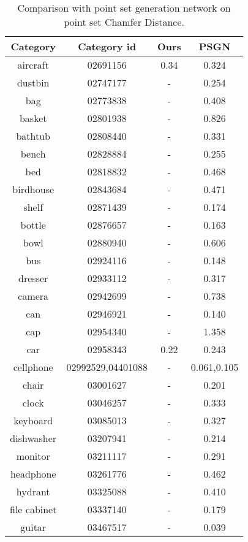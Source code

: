 \begin{table*}
	\centering
	\caption{Comparison with point set generation network on point set Chamfer Distance. }
	\begin{tabular}{c c c c}
		Category & Category id & Ours & PSGN\cite{PSGN} \\
		\hline
		aircraft & 02691156 & 0.34 & 0.324\\   
		dustbin & 02747177 &- & 0.254\\
		bag & 02773838  &- &  0.408\\
		basket & 02801938 &- & 0.826\\
		bathtub & 02808440 &- & 0.331\\
		bench & 02828884 & - & 0.255\\
		bed & 02818832 & - & 0.468\\
		birdhouse & 02843684 & - & 0.471\\
		shelf & 02871439 &- & 0.174\\
		bottle & 02876657 &- & 0.163\\
		bowl & 02880940 &- & 0.606\\
		bus & 02924116 &- & 0.148\\
		dresser & 02933112 &- & 0.317\\
		camera & 02942699 &- & 0.738\\
		can & 02946921 & - & 0.140\\
		cap & 02954340 & - & 1.358\\
		car & 02958343 & 0.22 & 0.243\\
		cellphone & 02992529,04401088 & - & 0.061,0.105\\
		chair & 03001627 & - & 0.201\\
		clock & 03046257 & - & 0.333\\
		keyboard & 03085013 & - & 0.327\\
		dishwasher & 03207941 & - & 0.214\\
		monitor & 03211117 & - & 0.291\\
		headphone & 03261776 & - & 0.462\\
		hydrant & 03325088 & - & 0.410\\
		file cabinet& 03337140 & - & 0.179\\
		guitar & 03467517 & - & 0.039\\

\end{tabular}
\end{table*}
